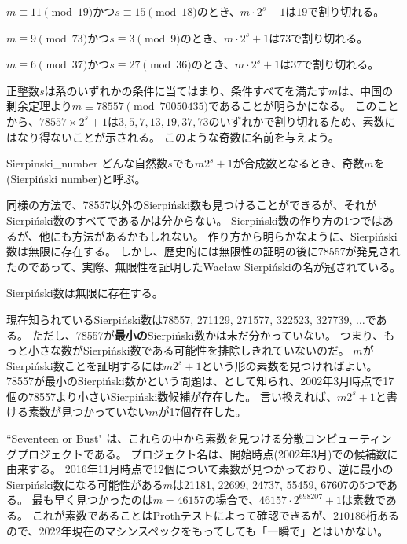 \begin{Coro}{}{}
$m\equiv11\pmod{19}$かつ$s\equiv15\pmod{18}$のとき、$m\cdot 2^s+1$は$19$で割り切れる。
\end{Coro}

\begin{Coro}{}{}
$m\equiv9\pmod{73}$かつ$s\equiv3\pmod{9}$のとき、$m\cdot 2^s+1$は$73$で割り切れる。
\end{Coro}

\begin{Coro}{}{}
$m\equiv6\pmod{37}$かつ$s\equiv27\pmod{36}$のとき、$m\cdot 2^s+1$は$37$で割り切れる。
\end{Coro}

正整数$s$は系のいずれかの条件に当てはまり、条件すべてを満たす$m$は、中国の剰余定理より$m\equiv78557\pmod{70050435}$であることが明らかになる。
このことから、$78557\times 2^s+1$は$3, 5, 7, 13, 19, 37, 73$のいずれかで割り切れるため、素数にはなり得ないことが示される。
このような奇数に名前を与えよう。

\begin{Defi}{}{Sierpinski_number}
どんな自然数$s$でも$m2^s+1$が合成数となるとき、奇数$m$を(Sierpiński number)と呼ぶ。
\end{Defi}

同様の方法で、78557以外のSierpiński数も見つけることができるが、それがSierpiński数のすべてであるかは分からない。
Sierpiński数の作り方の1つではあるが、他にも方法があるかもしれない。
作り方から明らかなように、Sierpiński数は無限に存在する。
しかし、歴史的には無限性の証明の後に78557が発見されたのであって、実際、無限性を証明したWacław Sierpińskiの名が冠されている。

\begin{Theo}{\cite{Sierpinski1960}}{}
Sierpiński数は無限に存在する。
\end{Theo}

現在知られているSierpiński数は78557, 271129, 271577, 322523, 327739, $\ldots$である。
ただし、78557が\textbf{最小の}Sierpiński数かは未だ分かっていない。
つまり、もっと小さな数がSierpiński数である可能性を排除しきれていないのだ。
$m$がSierpiński数ことを証明するには$m2^s+1$という形の素数を見つければよい。
78557が最小のSierpiński数かという問題は、として知られ、2002年3月時点で17個の78557より小さいSierpiński数候補が存在した。
言い換えれば、$m2^s+1$と書ける素数が見つかっていない$m$が17個存在した。

``Seventeen or Bust" は、これらの中から素数を見つける分散コンピューティングプロジェクトである。
プロジェクト名は、開始時点(2002年3月)での候補数に由来する。
2016年11月時点で12個について素数が見つかっており、逆に最小のSierpiński数になる可能性がある$m$は21181, 22699, 24737, 55459, 67607の5つである。
最も早く見つかったのは$m=46157$の場合で、$46157\cdot2^{698207}+1$は素数である。
これが素数であることはProthテストによって確認できるが、$210186$桁あるので、2022年現在のマシンスペックをもってしても「一瞬で」とはいかない。

